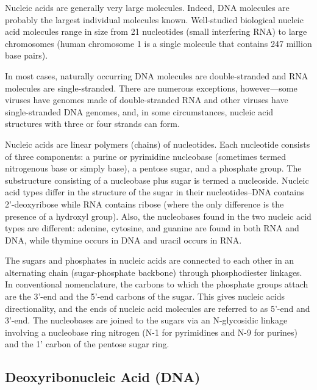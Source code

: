 Nucleic acids are generally very large molecules. Indeed, DNA molecules are probably the largest individual molecules known. Well-studied biological nucleic acid molecules range in size from 21 nucleotides (small interfering RNA) to large chromosomes (human chromosome 1 is a single molecule that contains 247 million base pairs).

In most cases, naturally occurring DNA molecules are double-stranded and RNA molecules are single-stranded. There are numerous exceptions, however---some viruses have genomes made of double-stranded RNA and other viruses have single-stranded DNA genomes, and, in some circumstances, nucleic acid structures with three or four strands can form.

Nucleic acids are linear polymers (chains) of nucleotides. Each nucleotide consists of three components: a purine or pyrimidine nucleobase (sometimes termed nitrogenous base or simply base), a pentose sugar, and a phosphate group. The substructure consisting of a nucleobase plus sugar is termed a nucleoside. Nucleic acid types differ in the structure of the sugar in their nucleotides--DNA contains 2'-deoxyribose while RNA contains ribose (where the only difference is the presence of a hydroxyl group). Also, the nucleobases found in the two nucleic acid types are different: adenine, cytosine, and guanine are found in both RNA and DNA, while thymine occurs in DNA and uracil occurs in RNA.

The sugars and phosphates in nucleic acids are connected to each other in an alternating chain (sugar-phosphate backbone) through phosphodiester linkages. In conventional nomenclature, the carbons to which the phosphate groups attach are the 3'-end and the 5'-end carbons of the sugar. This gives nucleic acids directionality, and the ends of nucleic acid molecules are referred to as 5'-end and 3'-end. The nucleobases are joined to the sugars via an N-glycosidic linkage involving a nucleobase ring nitrogen (N-1 for pyrimidines and N-9 for purines) and the 1' carbon of the pentose sugar ring.

\hypertarget{deoxyribonucleic-acid-dna}{%
\subsection{Deoxyribonucleic Acid (DNA)}\label{deoxyribonucleic-acid-dna}}

